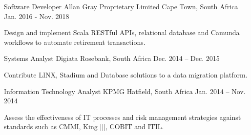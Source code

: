\begin{cventries}
  \cventry
    {Software Developer} %
    {Allan Gray Proprietary Limited} %
    {Cape Town, South Africa} %
    {Jan. 2016 - Nov. 2018} %
    {
      \begin{cvitems} %
        \item {Design and implement Scala RESTful APIs, relational database and Camunda workflows to automate retirement transactions.} 
      \end{cvitems}
    }
  \cventry
  {Systems Analyst} %
  {Digiata} %
  {Rosebank, South Africa} %
  {Dec. 2014 – Dec. 2015}%
  {
    \begin{cvitems} %
      \item {Contribute LINX, Stadium and Database solutions to a data migration platform.}
    \end{cvitems}
  }
  \cventry
  {Information Technology Analyst} %
  {KPMG} %
  {Hatfield, South Africa} %
  {Jan. 2014 – Nov. 2014} %
  {
    \begin{cvitems} %
      \item{Assess the effectiveness of IT processes and risk management strategies against standards such as CMMI, King |||, COBIT and ITIL.}
    \end{cvitems}
  }
\end{cventries}


